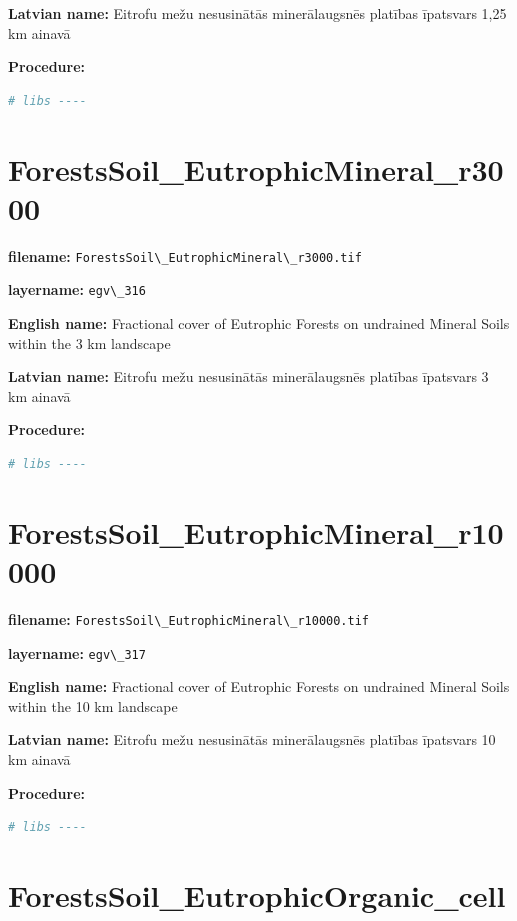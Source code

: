 \documentclass[
]{book}
\newcommand{\passthrough}[1]{#1}
\begin{document}
\textbf{Latvian name:} Eitrofu mežu nesusinātās minerālaugsnēs platības īpatsvars 1,25 km ainavā

\textbf{Procedure:}

\begin{lstlisting}[language=R]
# libs ----
\end{lstlisting}

\section{ForestsSoil\_EutrophicMineral\_r3000}\label{ch06.316}

\textbf{filename:} \passthrough{\lstinline!ForestsSoil\_EutrophicMineral\_r3000.tif!}

\textbf{layername:} \passthrough{\lstinline!egv\_316!}

\textbf{English name:} Fractional cover of Eutrophic Forests on undrained Mineral Soils within the 3 km landscape

\textbf{Latvian name:} Eitrofu mežu nesusinātās minerālaugsnēs platības īpatsvars 3 km ainavā

\textbf{Procedure:}

\begin{lstlisting}[language=R]
# libs ----
\end{lstlisting}

\section{ForestsSoil\_EutrophicMineral\_r10000}\label{ch06.317}

\textbf{filename:} \passthrough{\lstinline!ForestsSoil\_EutrophicMineral\_r10000.tif!}

\textbf{layername:} \passthrough{\lstinline!egv\_317!}

\textbf{English name:} Fractional cover of Eutrophic Forests on undrained Mineral Soils within the 10 km landscape

\textbf{Latvian name:} Eitrofu mežu nesusinātās minerālaugsnēs platības īpatsvars 10 km ainavā

\textbf{Procedure:}

\begin{lstlisting}[language=R]
# libs ----
\end{lstlisting}

\section{ForestsSoil\_EutrophicOrganic\_cell}\label{ch06.318}
\end{document}
